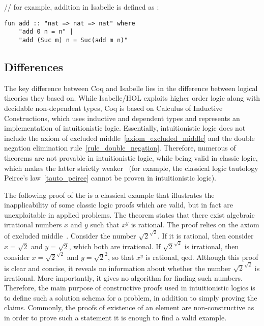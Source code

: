 \documentclass[article]{aaltoseries}
\begin{document}
\begin{tabular}{p{.45\linewidth} p{.45\linewidth}}
\end{tabular}
    

// for example, addition in Isabelle is defined as :
\begin{lstlisting}[language=isabelle]
fun add :: "nat => nat => nat" where
	"add 0 n = n" |
	"add (Suc m) n = Suc(add m n)"
\end{lstlisting}


\subsection{Differences}

The key difference between Coq and Isabelle lies in the difference between logical theories they based on. While Isabelle/HOL exploits higher order logic along with decidable non-dependent types, Coq is based on Calculus of Inductive Constructions, which uses inductive and dependent types and represents an implementation of intuitionistic logic. Essentially, intuitionistic logic does not include the axiom of excluded middle~\eqref{axiom_excluded_middle} and the double negation elimination rule~\eqref{rule_double_negation}.
Therefore, numerous of theorems are not provable in intuitionistic logic, while being valid in classic logic, which makes the latter strictly weaker~\cite{Rush14} (for example, the classical logic tautology Peirce's law~\eqref{tauto_peirce} cannot be proven in intuitionistic logic).

The following proof of the is a classical example that illustrates the inapplicability of some classic logic proofs which are valid, but in fact are unexploitable in applied problems. The theorem states that there exist algebraic irrational numbers $x$ and $y$ such that $x^y$ is rational. The proof relies on the axiom of excluded middle~\cite{Harrison09}. Consider the number $\sqrt{2}^{\sqrt{2}}$. If it is rational, then consider $x = \sqrt{2}$ and $y = \sqrt{2}$, which both are irrational. If $\sqrt{2}^{\sqrt{2}}$ is irrational, then consider $x = \sqrt{2}^{\sqrt{2}}$ and $y = \sqrt{2}^{2}$, so that $x^{y}$ is rational, qed. Although this proof is clear and concise, it reveals no information about whether the number $\sqrt{2}^{\sqrt{2}}$ is irrational. More importantly, it gives no algorithm for finding such numbers. Therefore, the main purpose of constructive proofs used in intuitionistic logics is to define such a solution schema for a problem, in addition to simply proving the claims.
Commonly, the proofs of existence of an element are non-constructive as in order to prove such a statement it is enough to find a valid example. %
\end{document}
